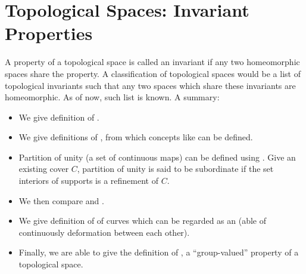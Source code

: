 \documentclass{article}
\begin{document}
\section{Topological Spaces: Invariant  Properties}
A property of a topological space is called an invariant if any two homeomorphic spaces share the property. A classification of topological spaces would be a list of topological invariants such that any two spaces which share these invariants are homeomorphic. As of now,  such list is known. 
A summary:
\begin{itemize}[$\blacktriangleright$]
\item We give definition of .
\item We give definitions of , from which concepts like  can be defined.
\item Partition of unity (a set of continuous maps) can be defined using  . Give an existing cover $C$, partition of unity is said to be subordinate if the set interiors of supports is a refinement of $C$.
\item We then compare  and .
\item We give definition of  of curves which can be regarded as an  (able of continuously deformation between each other).
\item Finally, we are able to give the definition of ,  a ``group-valued'' property of a topological space.
\end{itemize}
\end{document}

